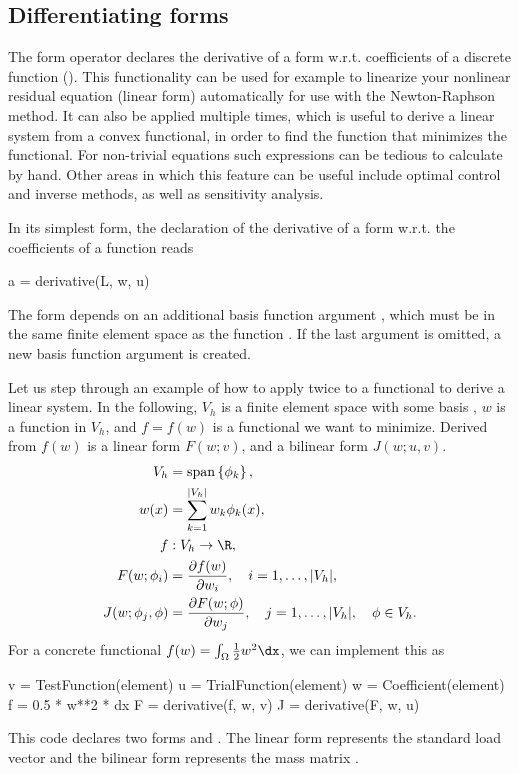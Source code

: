 \subsection{Differentiating forms}
\label{ufl:sec:derivative}

The form operator  declares the derivative of a form
w.r.t. coefficients of a discrete function ().  This
functionality can be used for example to linearize your nonlinear
residual equation (linear form) automatically for use with the
Newton-Raphson method.  It can also be applied multiple times, which
is useful to derive a linear system from a convex functional, in order
to find the function that minimizes the functional.  For non-trivial
equations such expressions can be tedious to calculate by hand.  Other
areas in which this feature can be useful include optimal control and
inverse methods, as well as sensitivity analysis.

In its simplest form, the declaration of the derivative of a form
 w.r.t. the coefficients of a function  reads
\begin{python}
a = derivative(L, w, u)
\end{python}
The form  depends on an additional basis function argument
, which must be in the same finite element space as the function .
If the last argument is omitted, a new basis function argument is
created.

Let us step through an example of how to apply 
twice to a functional to derive a linear system.  In the following,
$V_h$ is a finite element space with some basis , $w$ is a function in
$V_h$, and $f = f(w)$ is a functional we want to minimize. Derived
from $f(w)$ is a linear form $F(w; v)$, and a bilinear form
$J(w; u, v)$.
\begin{align}
V_h &= \spans{ \phi_k }, \\
w(x) &= \sum_{k=1}^{|V_h|} w_k \phi_k(x), \\
f&: V_h \rightarrow \R, \\
F(w; \phi_i) &= \frac{\partial f(w)}{\partial w_i},
  \quad i=1,\ldots,|V_h|, \\
J(w; \phi_j, \phi) &= \frac{\partial F(w; \phi)}{\partial w_j},
  \quad j=1,\ldots,|V_h|, \quad \phi\in V_h.
\end{align}
For a concrete functional $f(w) = \int_\Omega \frac 1 2 w^2 \dx$, we can implement this as
\begin{python}
v = TestFunction(element)
u = TrialFunction(element)
w = Coefficient(element)
f = 0.5 * w**2 * dx
F = derivative(f, w, v)
J = derivative(F, w, u)
\end{python}
This code declares two forms  and .  The linear form
 represents the standard load vector  and the
bilinear form  represents the mass matrix .

